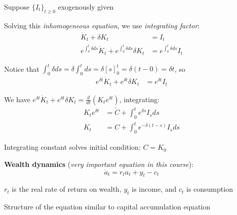 \documentclass[11pt, aspectratio=169]{beamer}
\newenvironment{witemize}{\itemize\addtolength{\itemsep}{10pt}}{\enditemize}
\begin{document}
\begin{frame}{}

\begin{witemize}
\item Suppose $\{ I_t \}_{t \geq 0}$ exogenously given

\item Solving this \textit{inhomogeneous equation}, we use \textit{integrating factor}:
\begin{align*}
	\dot K_t + \delta K_t &= I_t  \\
	e^{\int_0^t \delta ds} \dot K_t + e^{\int_0^t \delta ds} \delta K_t &= e^{\int_0^t \delta ds} I_t
\end{align*}

\item Notice that $\int_0^t \delta ds = \delta \int_0^t ds = \delta [s]_0^t = \delta(t - 0) = \delta t$, so 
\begin{align*}
	e^{\delta t} \dot K_t + e^{\delta t} \delta K_t &= e^{\delta t} I_t
\end{align*}

\item We have $e^{\delta t} \dot K_t + e^{\delta t} \delta K_t = \frac{d}{dt} (K_t e^{\delta t})$, integrating:
\begin{align*}
	K_t e^{\delta t} &= \tilde C + \int_0^t e^{\delta s} I_s ds \\
	K_t &= C + \int_0^t e^{- \delta(t-s)} I_s ds
\end{align*}

\item Integrating constant solves initial condition: $C = K_0$
\end{witemize}
\end{frame}



\begin{frame}{}
\textbf{Wealth dynamics} (\textit{very important equation in this course}):
\begin{equation*}
\dot a_t = r_t a_t + y_t - c_t
\end{equation*}
\begin{witemize}
\item $r_t$ is the real rate of return on wealth, $y_t$ is income, and $c_t$ is consumption

\item Structure of the equation similar to capital accumulation equation
\end{witemize}
\end{frame}
\end{document}

